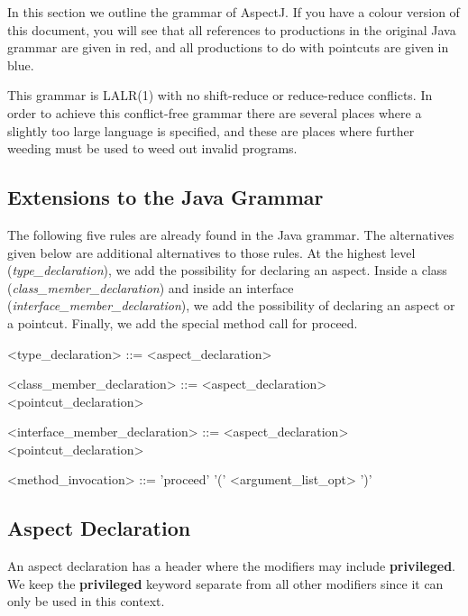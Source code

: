 In this section we outline the grammar of AspectJ.   If you have a colour
version of this document,  you will see that all references to
productions in the original Java grammar are given in red,  and all
productions to do with pointcuts are given in blue.

This grammar is LALR(1) with no shift-reduce or reduce-reduce conflicts.
In order to achieve this conflict-free grammar there are several places
where a slightly too large language is specified, and these are places
where further weeding must be used to weed out invalid programs.

\subsection{Extensions to the Java Grammar}

The following five rules are already found in the Java grammar.  The
alternatives given below are additional alternatives to those rules.    At the
highest level ({\em type\_declaration}), we add the possibility for declaring
an aspect.    Inside a class ({\em class\_member\_declaration}) and inside an
interface ({\em interface\_member\_declaration}), we
add the possibility of declaring an aspect or a pointcut.   Finally, we add the
special method call for proceed. 

\begin{minipage}{6in}
\begin{grammar}
<{\red type_declaration}> ::= <aspect_declaration>

<{\red class_member_declaration}> ::= <aspect_declaration>
                            \alt      <pointcut_declaration>

<{\red interface_member_declaration}> ::= <aspect_declaration>
                                 \alt     <pointcut_declaration>

<{\red method_invocation}> ::= 'proceed' '(' {\red <argument_list_opt>} ')'

\end{grammar}
\end{minipage}

\subsection{Aspect Declaration}

An aspect declaration has a header where the modifiers may include
{\bf privileged}.   We keep the {\bf privileged} keyword
separate from all other modifiers since it can only be used in this
context.   

